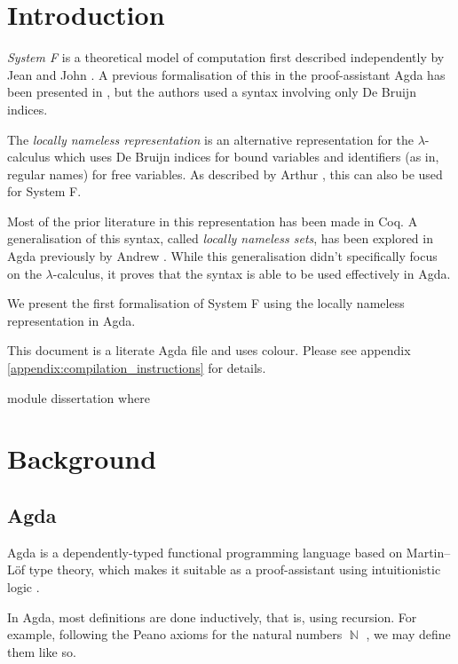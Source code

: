 \documentclass[logo,bsc,singlespacing,parskip,online]{infthesis}
\DeclareMathOperator{\nat}{\mathbb{N}}
\begin{document}
\chapter{Introduction}

\textit{System F} is a theoretical model of computation first described independently by
Jean \citet{girard_interpretation_1972} and John \citet{goos_towards_1974}. A previous formalisation of this
in the proof-assistant Agda has been presented in \citep{hutton_system_2019}, but the authors used a
syntax involving only De Bruijn indices.

The \textit{locally nameless representation} is an alternative representation for the
$\lambda$-calculus which uses De Bruijn indices for bound variables and identifiers (as in, regular
names) for free variables. As described by Arthur \citet{chargueraud_locally_2012}, this can also be
used for System F.

Most of the prior literature in this representation has been made in Coq. A generalisation of this
syntax, called \textit{locally nameless sets}, has been explored in Agda previously by Andrew
\citet{pitts_locally_2023}. While this generalisation didn't specifically focus on the
$\lambda$-calculus, it proves that the syntax is able to be used effectively in Agda.

We present the first formalisation of System F using the locally nameless representation in Agda.

This document is a literate Agda file and uses {\color{violet}colour}. Please see appendix
\ref{appendix:compilation_instructions} for details.

\begin{code}
module dissertation where
\end{code}

\chapter{Background}

\section{Agda}
Agda is a dependently-typed functional programming language based on Martin--Löf type theory, which
makes it suitable as a proof-assistant using intuitionistic logic \citep{norell_towards_2007}.

In Agda, most definitions are done inductively, that is, using recursion. For example, following the
Peano axioms for the natural numbers $\nat$ \citep{boolos_freges_1995}, we may define them like so.
\end{document}
